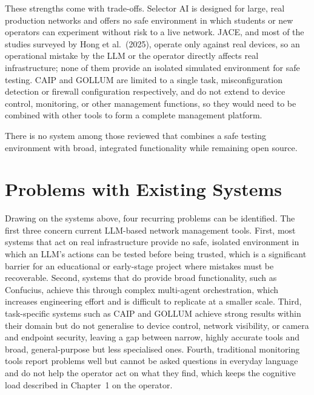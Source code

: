 These strengths come with trade-offs. Selector AI is designed for large, real
production networks and offers no safe environment in which students or new
operators can experiment without risk to a live network. JACE, and most of
the studies surveyed by Hong et al.\ (2025), operate only against real
devices, so an operational mistake by the LLM or the operator directly affects
real infrastructure; none of them provide an isolated simulated environment
for safe testing. CAIP and GOLLUM are limited to a single task,
misconfiguration detection or firewall configuration respectively, and do not
extend to device control, monitoring, or other management functions, so they
would need to be combined with other tools to form a complete management
platform.

There is no system among those reviewed that combines a safe testing
environment with broad, integrated functionality while remaining open source.

\section{Problems with Existing Systems}

Drawing on the systems above, four recurring problems can be identified.
The first three concern current LLM-based network management tools. First, most systems that act on
real infrastructure provide no safe, isolated environment in which an LLM's
actions can be tested before being trusted, which is a significant barrier for
an educational or early-stage project where mistakes must be recoverable.
Second, systems that do provide broad functionality, such as Confucius,
achieve this through complex multi-agent orchestration, which increases
engineering effort and is difficult to replicate at a smaller scale. Third,
task-specific systems such as CAIP and GOLLUM achieve strong results within
their domain but do not generalise to device control, network visibility, or
camera and endpoint security, leaving a gap between narrow, highly accurate
tools and broad, general-purpose but less specialised ones. Fourth,
traditional monitoring tools report problems well but cannot be asked
questions in everyday language and do not help the operator act on what
they find, which keeps the cognitive load described in Chapter~1 on the
operator.

